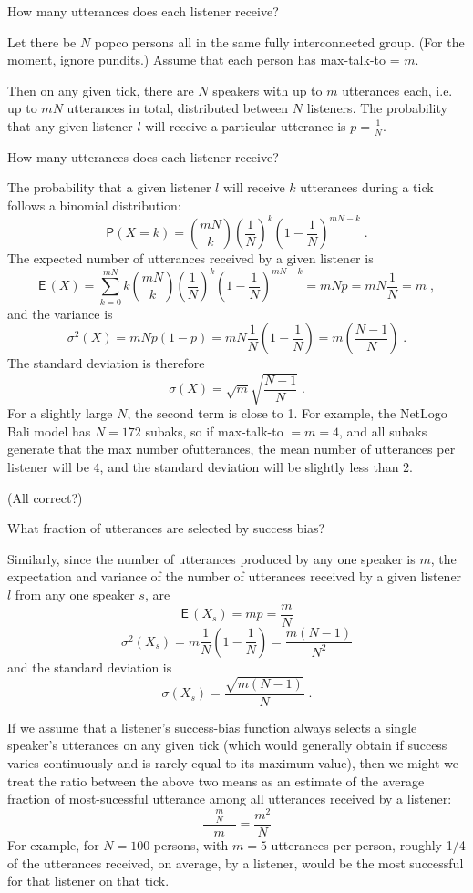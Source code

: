 \documentclass[12pt]{article}
\makeatletter
\newcommand{\ie}{i.e.\@\xspace}
\newcommand{\pr}{\mathsf{P}} %
\newcommand{\expct}{\mathsf E\,}
\newcommand{\var}{\sigma^2}
\newcommand{\stdv}{\sigma}
\newcommand{\comb}[2]{{{#1}\choose{#2}}}
\makeatother
\begin{document}

{\Large\sc How many utterances does each listener receive?}

Let there be $N$ popco persons all in the same fully
interconnected group.  (For the moment, ignore pundits.)  Assume
that each person has {\sf max-talk-to} = $m$.

Then on any given tick, there are $N$ speakers with up to $m$ utterances
each, \ie up to $mN$ utterances in total, distributed between $N$
listeners.  The probability that any given listener $l$ will
receive a particular utterance is $p=\frac{1}{N}$.

How many utterances does each listener receive?

The probability that a given listener $l$ will receive $k$
utterances during a tick follows a binomial distribution:
\[
    \pr(X=k) = \comb{mN}{k} \left(\frac{1}{N}\right)^k
    \left(1-\frac{1}{N}\right)^{mN-k} \;.
\]
The expected number of utterances received by a given listener is
\[
    \expct(X) = \sum_{k=0}^{mN}k\comb{mN}{k}
    \left(\frac{1}{N}\right)^k \left(1-\frac{1}{N}\right)^{mN-k}
    = mNp = mN\frac{1}{N} = m \;,
\]
and the variance is
\[
    \var(X) = mNp(1-p) = mN\frac{1}{N}\left(1-\frac{1}{N}\right)
    = m\left(\frac{N-1}{N}\right) \;.
\]
The standard deviation is therefore
\[
    \stdv(X) = \sqrt{m}\sqrt{\frac{N-1}{N}} \;.
\]
For a slightly large $N$, the second term is close to 1.  For
example, the NetLogo Bali model has $N=172$ subaks, so if {\sf
max-talk-to} $=m=4$, and all subaks generate that the max number
ofutterances, the mean number of utterances per listener will be
4, and the standard deviation will be slightly less than $2$.

(All correct?)

\vspace{4ex}


{\Large\sc What fraction of utterances are selected by success bias?}

Similarly, since the number of utterances produced by any one
speaker is $m$, the expectation and variance of the number of utterances
received by a given listener $l$ from any one speaker $s$, are
\[
\expct(X_s) = mp = \frac{m}{N}
\]
%
\[
\var(X_s) = m\frac{1}{N}\left(1 - \frac{1}{N}\right) = \frac{m(N-1)}{N^2}
\]
and the standard deviation is
\[
\stdv(X_s) = \frac{\sqrt{m(N-1)}}{N} \;.
\]

If we assume that a listener's success-bias function always
selects a single speaker's utterances on any given tick (which
would generally obtain if success varies continuously and is
rarely equal to its maximum value), then we might we treat the
ratio between the above two means as an estimate of the average
fraction of most-sucessful utterance among all utterances
received by a listener:
\[
    \frac{\frac{m}{N}}{\;\;\;m\;\;\;} = \frac{m^2}{N}
\]
For example, for $N=100$ persons, with $m=5$ utterances per person,
roughly 1/4 of the utterances received, on average, by a
listener, would be the most successful for that listener on that
tick.
\end{document}
